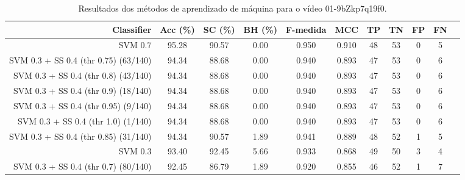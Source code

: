 \begin{table}[!htb]
\centering
\caption{Resultados dos métodos de aprendizado de máquina para o vídeo 01-9bZkp7q19f0.}
\label{tab:01-9bZkp7q19f0}
\begin{tabular}{r|c|c|c|c|c|c|c|c|c|c}
\hline\hline
Classifier & Acc (\%) & SC (\%) & BH (\%) & F-medida & MCC & TP & TN & FP & FN \\ \hline
SVM 0.7 & 95.28 & 90.57 & 0.00 & 0.950 & 0.910 & 48 & 53 & 0 & 5 \\ 
SVM 0.3 + SS 0.4 (thr 0.75) (63/140) & 94.34 & 88.68 & 0.00 & 0.940 & 0.893 & 47 & 53 & 0 & 6 \\ 
SVM 0.3 + SS 0.4 (thr 0.8) (43/140) & 94.34 & 88.68 & 0.00 & 0.940 & 0.893 & 47 & 53 & 0 & 6 \\ 
SVM 0.3 + SS 0.4 (thr 0.9) (18/140) & 94.34 & 88.68 & 0.00 & 0.940 & 0.893 & 47 & 53 & 0 & 6 \\ 
SVM 0.3 + SS 0.4 (thr 0.95) (9/140) & 94.34 & 88.68 & 0.00 & 0.940 & 0.893 & 47 & 53 & 0 & 6 \\ 
SVM 0.3 + SS 0.4 (thr 1.0) (1/140) & 94.34 & 88.68 & 0.00 & 0.940 & 0.893 & 47 & 53 & 0 & 6 \\ 
SVM 0.3 + SS 0.4 (thr 0.85) (31/140) & 94.34 & 90.57 & 1.89 & 0.941 & 0.889 & 48 & 52 & 1 & 5 \\ 
SVM 0.3 & 93.40 & 92.45 & 5.66 & 0.933 & 0.868 & 49 & 50 & 3 & 4 \\ 
SVM 0.3 + SS 0.4 (thr 0.7) (80/140) & 92.45 & 86.79 & 1.89 & 0.920 & 0.855 & 46 & 52 & 1 & 7 \\ 
\hline\hline
\end{tabular}
\end{table}
